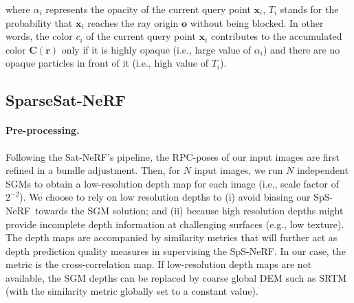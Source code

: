 \documentclass{isprs} %
\newcommand{\Nerf}{{NeRF}}
\newcommand{\OurNeRF}{{SparseSat-NeRF}}
\newcommand{\OurNeRFShort}{{SpS-NeRF}}
\begin{document}
where $\alpha_i$ represents the opacity of the current query point $\textbf{x}_i$, $T_i$ stands for the probability that $\textbf{x}_i$ reaches the ray origin $\textbf{o}$ without being blocked. In other words, the color $c_i$ of the current query point $\textbf{x}_i$ contributes to the accumulated color $\textbf{C}(\textbf{r})$ only if it is highly opaque (i.e., large value of $\alpha_i$) and there are no opaque particles in front of it (i.e., high value of $T_i$).



\subsection{\OurNeRF} 
\paragraph{Pre-processing.}
Following the Sat-\Nerf's pipeline, the RPC-poses of our input images are first refined in a bundle adjustment. Then, for $N$ input images, we run $N$ independent SGMs to obtain a low-resolution depth map for each image (i.e., scale factor of $2^{-2}$). We choose to rely on low resolution depths to (i) avoid biasing our \OurNeRFShort~towards the SGM solution; and (ii) because high resolution depths might provide incomplete depth information at challenging surfaces (e.g., low texture). The depth maps are accompanied by similarity metrics that will further act as depth prediction quality measures in supervising the \OurNeRFShort. In our case, the metric is the cross-correlation map. If low-resolution depth maps are not available, the SGM depths can be replaced by coarse global DEM such as SRTM (with the similarity metric globally set to a constant value).
\end{document}
